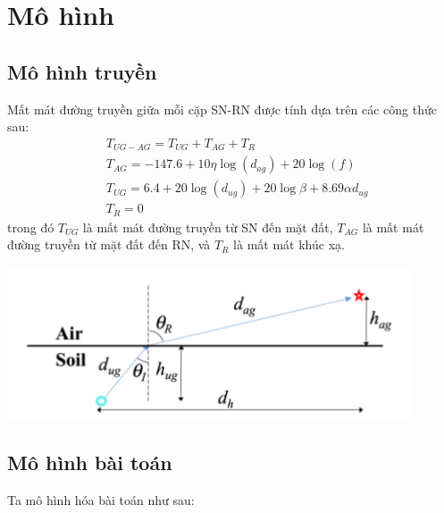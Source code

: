 \documentclass[hidelinks, 11pt, a4paper]{report}
\begin{document}
\section{Mô hình}
\subsection{Mô hình truyền}
Mất mát đường truyền giữa mỗi cặp SN-RN được tính dựa trên các công thức sau:
\begin{align*}
    & T_{UG-AG} = T_{UG} + T_{AG} + T_R\\
    & T_{AG} = -147.6 + 10\eta\log(d_{ag}) + 20\log(f)\\
    & T_{UG} = 6.4 + 20\log(d_{ug}) + 20\log\beta + 8.69\alpha d_{ug}\\
    & T_R = 0
\end{align*}
trong đó $T_{UG}$ là mất mát đường truyền từ SN đến mặt đất, $T_{AG}$ là mất mát đường truyền từ mặt đất đến RN, và $T_R$ là mất mát khúc xạ.

\begin{center}
    \includegraphics[scale=0.6]{transmission.png}
\end{center}

\subsection{Mô hình bài toán}
Ta mô hình hóa bài toán như sau:
\end{document}
